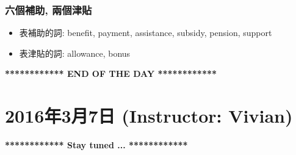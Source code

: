 \subsubsection*{六個補助, 兩個津貼}
\begin{itemize}
  \itemsep0em
  \item 表補助的詞: benefit, payment, assistance, subsidy, pension, support
  \item 表津貼的詞: allowance, bonus
\end{itemize}

\vspace{15mm}

\begin{center}
  \textbf{************ END OF THE DAY ************}
\end{center}
\newpage

\section{2016年3月7日 (Instructor: Vivian)}

\vspace{15mm}
\begin{center}
  \textbf{************ Stay tuned ... ************}
\end{center}